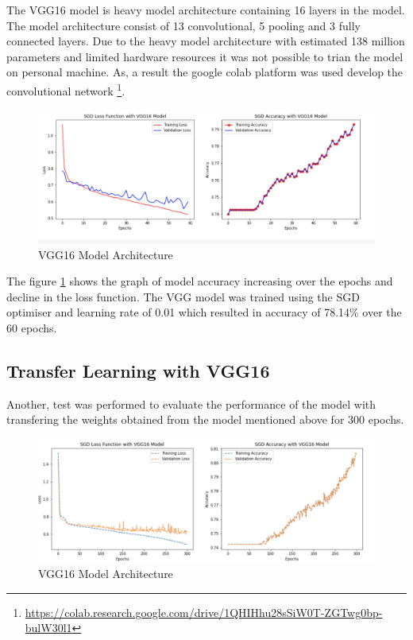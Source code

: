 The VGG16 model is heavy model architecture containing 16 layers in the 
model. The model architecture consist of 13 convolutional, 5 pooling and 3 fully connected 
layers. Due to the heavy model architecture with estimated 138 million parameters
and limited hardware resources it was not possible to trian the model on personal machine. As, a result the google colab platform was used develop
the convolutional network \footnote{\url{https://colab.research.google.com/drive/1QHIHhu28sSiW0T-ZGTwg0bp-bulW30l1}}.

\begin{figure}[!htp]
    \centering
    \includegraphics[width=\textwidth]{Images/vgg16Results.png}
    \caption{VGG16 Model Architecture}
    \label{fig:vggRes}
\end{figure}
The figure \ref{fig:vggRes} shows the graph of model accuracy increasing over the 
epochs and decline in the loss function. The VGG model was trained using the SGD optimiser and learning 
rate of 0.01 which resulted in accuracy of 78.14\% over the 60 epochs. 
\subsection{Transfer Learning with VGG16}
Another, test was performed to evaluate the performance of the model with transfering the
weights obtained from the model mentioned above for 300 epochs.

\begin{figure}[!htp]
    \centering
    \includegraphics[width=\textwidth]{Images/vgg162.png}
    \caption{VGG16 Model Architecture}
    \label{fig:vggRes2}
\end{figure}

